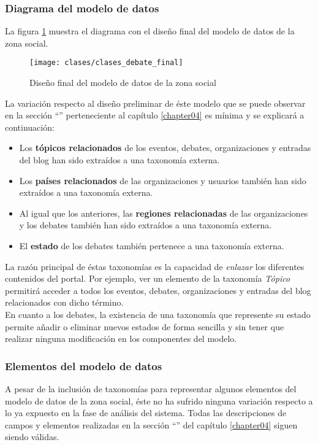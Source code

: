 \subsubsection{Diagrama del modelo de datos}
La figura \ref{fig:diagrama_modelo_social_final} muestra el diagrama con el diseño final del modelo de datos de la zona social.
\begin{landscape}
	\begin{figure}[h]
		\centering
		\texttt{[image: clases/clases\_debate\_final]}
		\caption{Diseño final del modelo de datos de la zona social}
		\label{fig:diagrama_modelo_social_final}
	\end{figure}
\end{landscape}

La variación respecto al diseño preliminar de éste modelo que se puede observar en la sección ``'' perteneciente al capítulo \ref{chapter04} es mínima y se explicará a continuación:
\begin{itemize}
	\item Los \textbf{tópicos relacionados} de los eventos, debates, organizaciones y entradas del blog han sido extraídos a una taxonomía externa.
	\item Los \textbf{países relacionados} de las organizaciones y usuarios también han sido extraídos a una taxonomía externa.
	\item Al igual que los anteriores, las \textbf{regiones relacionadas} de las organizaciones y los debates también han sido extraídos a una taxonomía externa.
	\item El \textbf{estado} de los debates también pertenece a una taxonomía externa.
\end{itemize}

La razón principal de éstas taxonomías es la capacidad de \textit{enlazar} los diferentes contenidos del portal.  Por ejemplo, ver un elemento de la taxonomía \textit{Tópico} permitirá acceder a todos los eventos, debates, organizaciones y entradas del blog relacionados con dicho término.\\
En cuanto a los debates, la existencia de una taxonomía que represente su estado permite añadir o eliminar nuevos estados de forma sencilla y sin tener que realizar ninguna modificación en los componentes del modelo.

\subsubsection{Elementos del modelo de datos}
A pesar de la inclusión de taxonomías para representar algunos elementos del modelo de datos de la zona social, éste no ha sufrido ninguna variación respecto a lo ya expuesto en la fase de análisis del sistema. Todas las descripciones de campos y elementos realizadas en la sección ``'' del capítulo \ref{chapter04} siguen siendo válidas.